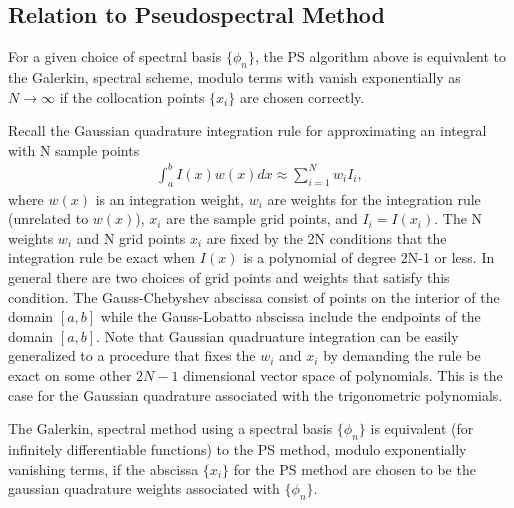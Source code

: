 \documentclass[aps,prd,amsmath,showpacs,amssymb,superscriptaddress,nofootinbib,longbibliography,eqsecnum,preprintnumbers]{revtex4-1}
\newcommand{\zach}[1]{\textcolor{ForestGreen}{#1}}
\begin{document}
\subsection{Relation to Pseudospectral Method}

For a given choice of spectral basis $\{\phi_n\}$, the PS algorithm above is equivalent to the Galerkin, spectral scheme, modulo terms with vanish exponentially as $N\to \infty$ if the collocation points $\{x_i\}$ are chosen correctly.

Recall the Gaussian quadrature integration rule for approximating an integral with N sample points
\begin{align}
\int_a^bI(x)w(x)dx\approx \sum_{i=1}^N w_i I_i,
\end{align}
where $w(x)$ is an integration weight, $w_i$ are weights for the integration rule (unrelated to $w(x)$), $x_i$ are the sample grid points, and $I_i=I(x_i)$. The N weights $w_i$ and N grid points $x_i$ are fixed by the 2N conditions that the integration rule be exact when $I(x)$ is a polynomial of degree 2N-1 or less. In general there are two choices of grid points and weights that satisfy this condition. The Gauss-Chebyshev abscissa consist of points on the interior of the domain $[a,b]$ while the Gauss-Lobatto abscissa include the endpoints of the domain $[a,b]$. Note that Gaussian quadruature integration can be easily generalized to a procedure that fixes the $w_i$ and $x_i$ by demanding the rule be exact on some other $2N-1$ dimensional vector space of polynomials. This is the case for the Gaussian quadrature associated with the trigonometric polynomials.

The Galerkin, spectral method using a spectral basis $\{\phi_n\}$ is equivalent (for infinitely differentiable functions) to the PS method, modulo exponentially vanishing terms, if the abscissa $\{x_i\}$ for the PS method are chosen to be the gaussian quadrature weights associated with $\{\phi_n\}$.
\end{document}
